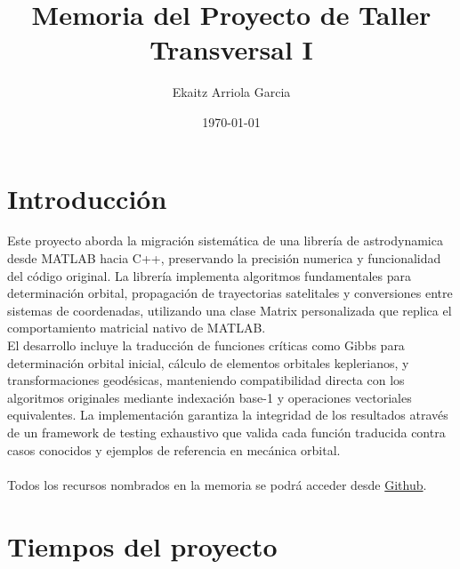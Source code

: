 \documentclass[12pt,a4paper]{article}
\title{Memoria del Proyecto de Taller Transversal I}
\author{Ekaitz Arriola Garcia}
\date{\today}
\begin{document}
\maketitle
\tableofcontents
\newpage




\section{Introducción}

Este proyecto aborda la migración sistemática de una librería de astrodynamica desde MATLAB hacia C++, preservando la precisión numerica y funcionalidad del código original. La librería implementa algoritmos fundamentales para determinación orbital, propagación de trayectorias satelitales y conversiones entre sistemas de coordenadas, utilizando una clase Matrix personalizada que replica el comportamiento matricial nativo de MATLAB. 
\\El desarrollo incluye la traducción de funciones críticas como Gibbs para determinación orbital inicial, cálculo de elementos orbitales keplerianos, y transformaciones geodésicas, manteniendo compatibilidad directa con los algoritmos originales mediante indexación base-1 y operaciones vectoriales equivalentes. La implementación garantiza la integridad de los resultados através de un framework de testing exhaustivo que valida cada función traducida contra casos conocidos y ejemplos de referencia en mecánica orbital.
\\\\
Todos los recursos nombrados en la memoria se podrá acceder desde \href{https://github.com/Ekaitz723/tallerTraversal1/}{Github}.


\section{Tiempos del proyecto}
\end{document}
